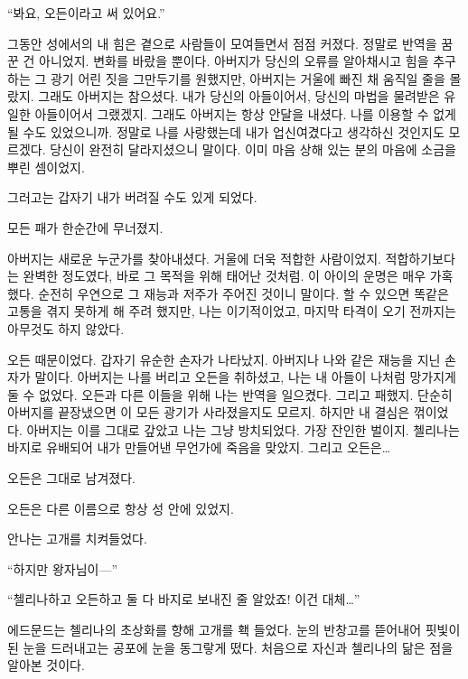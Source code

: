 ``봐요, 오든이라고 써 있어요.''\begin{letter}

그동안 성에서의 내 힘은 곁으로 사람들이 모여들면서 점점 커졌다. 정말로 반역을 꿈꾼 건 아니었지. 변화를 바랐을 뿐이다. 아버지가 당신의 오류를 알아채시고 힘을 추구하는 그 광기 어린 짓을 그만두기를 원했지만, 아버지는 거울에 빠진 채 움직일 줄을 몰랐지. 그래도 아버지는 참으셨다. 내가 당신의 아들이어서, 당신의 마법을 물려받은 유일한 아들이어서 그랬겠지. 그래도 아버지는 항상 안달을 내셨다. 나를 이용할 수 없게 될 수도 있었으니까. 정말로 나를 사랑했는데 내가 업신여겼다고 생각하신 것인지도 모르겠다. 당신이 완전히 달라지셨으니 말이다. 이미 마음 상해 있는 분의 마음에 소금을 뿌린 셈이었지.

그러고는 갑자기 내가 버려질 수도 있게 되었다.

모든 패가 한순간에 무너졌지.

아버지는 새로운 누군가를 찾아내셨다. 거울에 더욱 적합한 사람이었지. 적합하기보다는 완벽한 정도였다, 바로 그 목적을 위해 태어난 것처럼. 이 아이의 운명은 매우 가혹했다. 순전히 우연으로 그 재능과 저주가 주어진 것이니 말이다. 할 수 있으면 똑같은 고통을 겪지 못하게 해 주려 했지만, 나는 이기적이었고, 마지막 타격이 오기 전까지는 아무것도 하지 않았다.

오든 때문이었다. 갑자기 유순한 손자가 나타났지. 아버지나 나와 같은 재능을 지닌 손자가 말이다. 아버지는 나를 버리고 오든을 취하셨고, 나는 내 아들이 나처럼 망가지게 둘 수 없었다. 오든과 다른 이들을 위해 나는 반역을 일으켰다. 그리고 패했지. 단순히 아버지를 끝장냈으면 이 모든 광기가 사라졌을지도 모르지. 하지만 내 결심은 꺾이었다. 아버지는 이를 그대로 갚았고 나는 그냥 방치되었다. 가장 잔인한 벌이지. 첼리나는 바지로 유배되어 내가 만들어낸 무언가에 죽음을 맞았지. 그리고 오든은\ldots

오든은 그대로 남겨졌다.

오든은 다른 이름으로 항상 성 안에 있었지.

\end{letter}

안나는 고개를 치켜들었다.

``하지만 왕자님이—''

``첼리나하고 오든하고 둘 다 바지로 보내진 줄 알았죠! 이건 대체\ldots''

에드문드는 첼리나의 초상화를 향해 고개를 홱 들었다. 눈의 반창고를 뜯어내어 핏빛이 된 눈을 드러내고는 공포에 눈을 동그랗게 떴다. 처음으로 자신과 첼리나의 닮은 점을 알아본 것이다.

